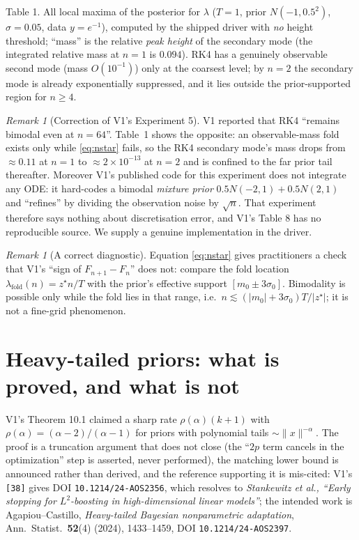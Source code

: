 \documentclass[11pt]{article}
\theoremstyle{definition}
\theoremstyle{remark}
\newtheorem{remark}[theorem]{Remark}
\begin{document}
\noindent Table 1. All local maxima of the posterior for $\lambda$ ($T=1$, prior $N(-1,0.5^2)$,
$\sigma=0.05$, data $y=e^{-1}$), computed by the shipped driver with \emph{no} height threshold;
``mass'' is the relative \emph{peak height} of the secondary mode (the integrated relative mass at
$n=1$ is $0.094$). RK4 has a genuinely observable second
mode (mass $O(10^{-1})$) only at the coarsest level; by $n=2$ the secondary mode is already
exponentially suppressed, and it lies outside the prior-supported region for $n\ge4$.

\begin{remark}[Correction of V1's Experiment 5]
V1 reported that RK4 ``remains bimodal even at $n=64$''. Table~1 shows the opposite: an
observable-mass fold exists only while \eqref{eq:nstar} fails, so the RK4 secondary mode's mass drops
from $\approx0.11$ at $n=1$ to $\approx2\times10^{-13}$ at $n=2$ and is confined to the far prior tail
thereafter. Moreover V1's published code for this experiment does not integrate any ODE: it
hard-codes a bimodal \emph{mixture prior} $0.5N(-2,1)+0.5N(2,1)$ and ``refines'' by dividing the
observation noise by $\sqrt n$. That experiment therefore says nothing about discretisation error,
and V1's Table 8 has no reproducible source. We supply a genuine implementation in the driver.
\end{remark}

\begin{remark}[A correct diagnostic]
Equation \eqref{eq:nstar} gives practitioners a check that V1's ``sign of $F_{n+1}-F_n$'' does not:
compare the fold location $\lambda_{\mathrm{fold}}(n)=z^\star n/T$ with the prior's effective support
$[m_0\pm3\sigma_0]$. Bimodality is possible only while the fold lies in that range, i.e.\
$n\lesssim(|m_0|+3\sigma_0)T/|z^\star|$; it is not a fine-grid phenomenon.
\end{remark}

\section{Heavy-tailed priors: what is proved, and what is not}\label{sec:tails}
V1's Theorem 10.1 claimed a sharp rate $\rho(\alpha)(k+1)$ with $\rho(\alpha)=(\alpha-2)/(\alpha-1)$
for priors with polynomial tails $\sim\|x\|^{-\alpha}$. The proof is a truncation argument that does
not close (the ``$2p$ term cancels in the optimization'' step is asserted, never performed), the
matching lower bound is announced rather than derived, and the reference supporting it is mis-cited:
V1's \texttt{[38]} gives DOI \texttt{10.1214/24-AOS2356}, which resolves to \emph{Stankewitz et al.,
``Early stopping for $L^2$-boosting in high-dimensional linear models''}; the intended work is
Agapiou--Castillo, \emph{Heavy-tailed Bayesian nonparametric adaptation}, Ann.\ Statist.\
\textbf{52}(4) (2024), 1433--1459, DOI \texttt{10.1214/24-AOS2397}.
\end{document}
